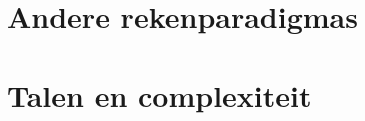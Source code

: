 \documentclass{exam}
\begin{document}
\vspace{0.5cm}



\newpage

\section{Andere rekenparadigmas}

\vspace{0.5cm}



\newpage

\section{Talen en complexiteit}

\vspace{0.5cm}


\end{document}
